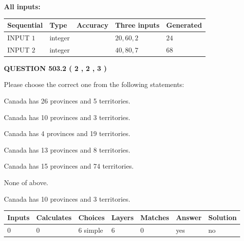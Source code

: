 \documentclass[12pt]{article}
\begin{document}
   
   
   
\noindent\vspace{0.1in}\hspace{-0.08in} {\textbf{\Large{All inputs: }}}
   
   
  
  
\noindent\begin{tabular}{|l|l|l|l|l|}
\hline
 Sequential & Type & Accuracy & Three inputs & Generated \\ 
\hline
 
 
  INPUT $  1 $ & integer &  & $
 20
 , 
 60
 , 
 2
 $ & $ 24 $ 
 \\  \hline  
 
 
  INPUT $  2 $ & integer &  & $
 40
 , 
 80
 , 
 7
 $ & $ 68 $ 
 \\  \hline  
 \end{tabular}
   
   
  
\vspace{0.2in}
  
{\textbf{\Large{QUESTION
503.2 
 ( 2 , 2 , 3 )
}}}
  
  
Please choose the correct one from the following statements:
 
 
Canada has  26 provinces and  5 territories.
 
 
Canada has 10  provinces and 3 territories.
 
 
Canada has   4 provinces and  19 territories.
 
 
Canada has  13 provinces and  8 territories.
 
 
Canada has  15 provinces and  74 territories.
 
 
 None of above.
 
 
\noindent{}
 
 
Canada has 10  provinces and 3 territories.
 
 
\noindent{}
 
 
   
   
   
   
\noindent\begin{tabular}{|l|l|l|l|l|l|l|}
 \hline
Inputs & Calculates & Choices & Layers & Matches & Answer & Solution \\ \hline
 0  & 
 0  & 
 6
  simple  
  & 
 6  & 
 0  & 
  yes & 
  no 
  \\ \hline
 \end{tabular}
   
\end{document}
